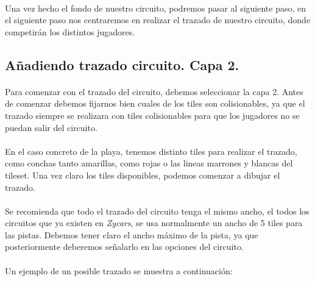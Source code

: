 \paragraph{}
Una vez hecho el fondo de nuestro circuito, podremos pasar al siguiente paso, en el siguiente paso nos centraremos en realizar el 
trazado de nuestro circuito, donde competirán los distintos jugadores.

\subsection{Añadiendo trazado circuito. Capa 2.}

\paragraph{}
Para comenzar con el trazado del circuito, debemos seleccionar la capa 2. Antes de comenzar debemos fijarnos bien cuales de los 
tiles son colisionables, ya que el trazado siempre se realizara con tiles colisionables para que los jugadores no se puedan salir
del circuito.

\paragraph{}
En el caso concreto de la playa, tenemos distinto tiles para realizar el trazado, como conchas tanto amarillas, como rojas o las 
lineas marrones y blancas del tileset. Una vez claro los tiles disponibles, podemos comenzar a dibujar el trazado.

\paragraph{}
Se recomienda que todo el trazado del circuito tenga el mismo ancho, el todos los circuitos que ya existen en \emph{Zycars}, se usa
normalmente un ancho de 5 tiles para las pistas. Debemos tener claro el ancho máximo de la pista, ya que posteriormente deberemos
señalarlo en las opciones del circuito.


\paragraph{}
Un ejemplo de un posible trazado se muestra a continuación:

